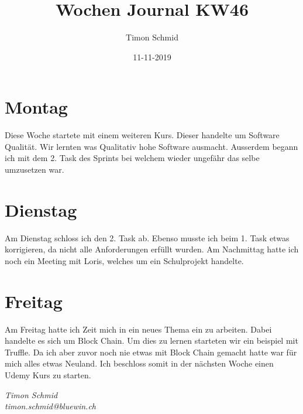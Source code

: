 \documentclass[12pt, titlepage]{article}
\title{Wochen Journal KW46}
\date{11-11-2019}
\author{Timon Schmid}
\begin{document}
  \maketitle

  \newpage


  \section{Montag}
  Diese Woche startete mit einem weiteren Kurs. Dieser handelte um Software
  Qualität. Wir lernten was Qualitativ hohe Software ausmacht. Ausserdem
  begann ich mit dem 2. Task des Sprints bei welchem wieder ungefähr das
  selbe umzusetzen war.

  \section{Dienstag}
  Am Dienstag schloss ich den 2. Task ab. Ebenso musste ich beim 1. Task
  etwas korrigieren, da nicht alle Anforderungen erfüllt wurden. Am Nachmittag
  hatte ich noch ein Meeting mit Loris, welches um ein Schulprojekt handelte.

  \section{Freitag}
  Am Freitag hatte ich Zeit mich in ein neues Thema ein zu arbeiten. Dabei handelte
  es sich um Block Chain. Um dies zu lernen starteten wir ein beispiel mit Truffle.
  Da ich aber zuvor noch nie etwas mit Block Chain gemacht hatte war für mich alles
  etwas Neuland. Ich beschloss somit in der nächsten Woche einen Udemy Kurs zu starten.

  \vspace*{\fill}
  \hfill \break
  \textit{Timon Schmid \\ timon.schmid@bluewin.ch}
\end{document}
